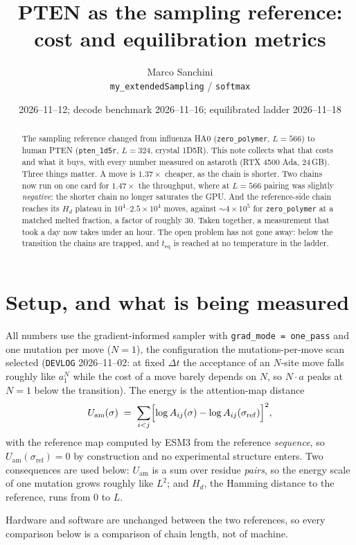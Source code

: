 \documentclass[11pt,a4paper]{article}
\title{PTEN as the sampling reference: cost and equilibration metrics}
\author{Marco Sanchini \\ \small\texttt{my\_extendedSampling} / \texttt{softmax}}
\date{2026--11--12; decode benchmark 2026--11--16; equilibrated ladder 2026--11--18}
\newcommand{\Hd}{H_d}
\newcommand{\file}[1]{\texttt{#1}}
\newcommand{\Uam}{U_{\mathrm{am}}}
\begin{document}
\maketitle

\begin{abstract}
\noindent
The sampling reference changed from influenza HA0 (\file{zero\_polymer},
$L=566$) to human PTEN (\file{pten\_1d5r}, $L=324$, crystal 1D5R). This note
collects what that costs and what it buys, with every number measured on
astaroth (RTX 4500 Ada, 24\,GB). Three things matter. A move is
$1.37\times$ cheaper, as the chain is shorter. Two chains now run on one card
for $1.47\times$ the throughput, where at $L=566$ pairing was slightly
\emph{negative}: the shorter chain no longer saturates the GPU. And the
reference-side chain reaches its $\Hd$ plateau in $10^4$--$2.5\times10^4$
moves, against ${\sim}4\times10^5$ for \file{zero\_polymer} at a matched
melted fraction, a factor of roughly 30. Taken together, a measurement that
took a day now takes under an hour. The open problem has not gone away: below
the transition the chains are trapped, and $t_{\mathrm{eq}}$ is reached at no
temperature in the ladder.
\end{abstract}

\section{Setup, and what is being measured}

All numbers use the gradient-informed sampler with \texttt{grad\_mode =
one\_pass} and one mutation per move ($N=1$), the configuration the
mutations-per-move scan selected (\file{DEVLOG} 2026--11--02: at fixed
$\Delta t$ the acceptance of an $N$-site move falls roughly like $a_1^N$ while
the cost of a move barely depends on $N$, so $N\!\cdot\!a$ peaks at $N=1$ below
the transition). The energy is the attention-map distance
\begin{equation}
  \Uam(\sigma) \;=\; \sum_{i<j}\Bigl[\log A_{ij}(\sigma) - \log A_{ij}(\sigma_{\mathrm{ref}})\Bigr]^2 ,
\end{equation}
with the reference map computed by ESM3 from the reference \emph{sequence}, so
$\Uam(\sigma_{\mathrm{ref}}) = 0$ by construction and no experimental structure
enters. Two consequences are used below: $\Uam$ is a sum over residue
\emph{pairs}, so the energy scale of one mutation grows roughly like $L^2$; and
$\Hd$, the Hamming distance to the reference, runs from 0 to $L$.

Hardware and software are unchanged between the two references, so every
comparison below is a comparison of chain length, not of machine.
\end{document}
